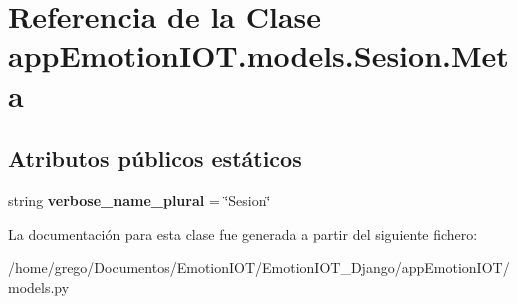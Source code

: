 \hypertarget{classappEmotionIOT_1_1models_1_1Sesion_1_1Meta}{}\section{Referencia de la Clase app\+Emotion\+I\+O\+T.\+models.\+Sesion.\+Meta}
\label{classappEmotionIOT_1_1models_1_1Sesion_1_1Meta}
\subsection*{Atributos públicos estáticos}
\begin{DoxyCompactItemize}
\item 
string {\bfseries verbose\+\_\+name\+\_\+plural} = \char`\"{}Sesion\char`\"{}\hypertarget{classappEmotionIOT_1_1models_1_1Sesion_1_1Meta_a1e6d6a6eedb500eb0265acbd1ae27cee}{}\label{classappEmotionIOT_1_1models_1_1Sesion_1_1Meta_a1e6d6a6eedb500eb0265acbd1ae27cee}

\end{DoxyCompactItemize}


La documentación para esta clase fue generada a partir del siguiente fichero\+:\begin{DoxyCompactItemize}
\item 
/home/grego/\+Documentos/\+Emotion\+I\+O\+T/\+Emotion\+I\+O\+T\+\_\+\+Django/app\+Emotion\+I\+O\+T/models.\+py\end{DoxyCompactItemize}

